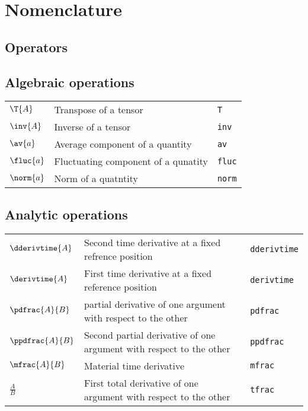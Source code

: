 \section*{Nomenclature}\label{sec:nomenclature}

\subsection*{Operators}

\subsection*{Algebraic operations}
\begin{tabular}{l l l}
$\T{A}$ & Transpose of a tensor& \texttt{T}\\
$\inv{A}$ & Inverse of a tensor& \texttt{inv}\\
$\av{a}$ & Average component of a quantity& \texttt{av}\\
$\fluc{a}$ & Fluctuating component of a qunatity& \texttt{fluc}\\
$\norm{a}$ & Norm of a quatntity& \texttt{norm}\\
\end{tabular}

\subsection*{Analytic operations}
\begin{tabular}{l l l}
$\dderivtime{A}$ & Second time derivative at a fixed refrence position& \texttt{dderivtime}\\
$\derivtime{A}$ & First time derivative at a fixed reference position& \texttt{derivtime}\\
$\pdfrac{A}{B}$ & partial derivative of one argument with respect to the other& \texttt{pdfrac}\\
$\ppdfrac{A}{B}$ & Second partial derivative of one argument with respect to the other& \texttt{ppdfrac}\\
$\mfrac{A}{B}$ & Material time derivative& \texttt{mfrac}\\
$\tfrac{A}{B}$ & First total derivative of one argument with respect to the other& \texttt{tfrac}\\
\end{tabular}

